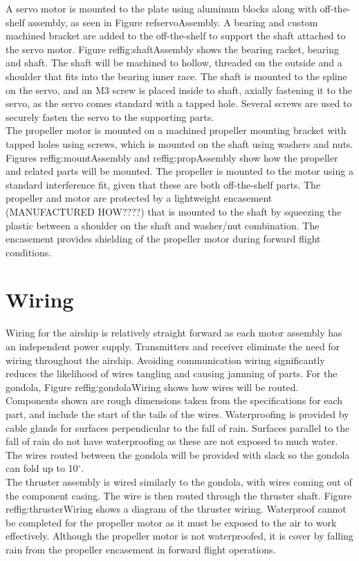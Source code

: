 \documentclass[../main.tex]{subfiles}
\begin{document}
 A servo motor is mounted to the plate using aluminum blocks along with off-the-shelf assembly, as seen in Figure ref{servoAssembly}. A bearing and custom machined bracket are added to the off-the-shelf to support the shaft attached to the servo motor. Figure ref{fig:shaftAssembly} shows the bearing racket, bearing and shaft. The shaft will be machined to hollow, threaded on the outside and a shoulder that fits into the bearing inner race. The shaft is mounted to the spline on the servo, and an M3 screw is placed inside to shaft, axially fastening it to the servo, as the servo comes standard with a tapped hole. Several screws are used to securely fasten the servo to the supporting parts.
 \\
 
The propeller motor is mounted on a machined propeller mounting bracket with tapped holes using screws, which is mounted on the shaft using washers and nuts. Figures ref{fig:mountAssembly} and ref{fig:propAssembly} show how the propeller and related parts will be mounted. The propeller is mounted to the motor using a standard interference fit, given that these are both off-the-shelf parts. The propeller and motor are protected by a lightweight encasement (MANUFACTURED HOW????) that is mounted to the shaft by squeezing the plastic between a shoulder on the shaft and washer/nut combination. The encasement provides shielding of the propeller motor during forward flight conditions.\\

\section{Wiring}
Wiring for the airship is relatively straight forward as each motor assembly has an  independent power supply. Transmitters and receiver eliminate the need for wiring throughout the airship. Avoiding communication wiring significantly reduces the likelihood of wires tangling and causing jamming of parts. For the gondola, Figure ref{fig:gondolaWiring} shows how wires will be routed. Components shown are rough dimensions taken from the specifications for each part, and include the start of the tails of the wires. Waterproofing is provided by cable glands for surfaces perpendicular to the fall of rain. Surfaces parallel to the fall of rain do not have waterproofing as these are not exposed to much water. The wires routed between the gondola will be provided with slack so the gondola can fold up to 10$^{\circ}$.
\\

The thruster assembly is wired similarly to the gondola, with wires coming out of the component casing. The wire is then routed through the thruster shaft. Figure ref{fig:thrusterWiring} shows a diagram of the thruster wiring. Waterproof cannot be completed for the propeller motor as it must be exposed to the air to work effectively. Although the propeller motor is not waterproofed, it is cover by falling rain from the propeller encasement in forward flight operations.
\end{document}
